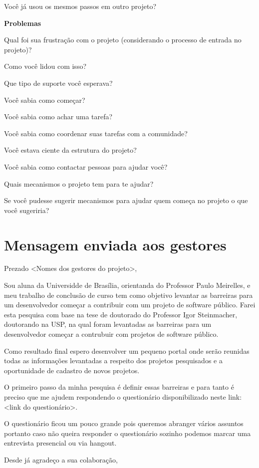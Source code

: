 \begin{anexosenv}
Você já usou os mesmos passos em outro projeto?

\textbf{Problemas}


Qual foi sua frustração com o projeto (considerando o processo de entrada no projeto)?

Como você lidou com isso?

Que tipo de suporte você esperava?

Você sabia como começar?

Você sabia como achar uma tarefa?

Você sabia como coordenar suas tarefas com a comunidade?

Você estava ciente da estrutura do projeto?

Você sabia como contactar pessoas para ajudar você?

Quais mecanismos o projeto tem para te ajudar?

Se você pudesse sugerir mecanismos para ajudar quem começa no projeto o que você sugeriria?


\chapter{Mensagem enviada aos gestores}
\label{anexo d}

Prezado <Nomes dos gestores do projeto>,

Sou aluna da Universidde de Brasília, orientanda do Professor Paulo Meirelles, 
e meu trabalho de conclusão de curso tem como objetivo levantar as barreiras para 
um desenvolvedor começar a contribuir com um projeto de software público. Farei 
esta pesquisa com base na tese de doutorado do Professor Igor Steinmacher, 
doutorando na USP, na qual foram levantadas as barreiras para um desenvolvedor 
começar a contrubuir com projetos de software público.

Como resultado final espero desenvolver um pequeno portal onde serão 
reunidas todas as informações levantadas a respeito dos projetos pesquisados e a 
oportunidade de cadastro de novos projetos.

O primeiro passo da minha pesquisa é definir essas barreiras e para tanto é
preciso que me ajudem respondendo o questionário disponibilizado neste link:
<link do questionário>.

O questionário ficou um pouco grande pois queremos abranger vários assuntos 
portanto caso não queira responder o questionário sozinho podemos marcar uma 
entrevista presencial ou via hangout.

Desde já agradeço a sua colaboração,



\end{anexosenv}
